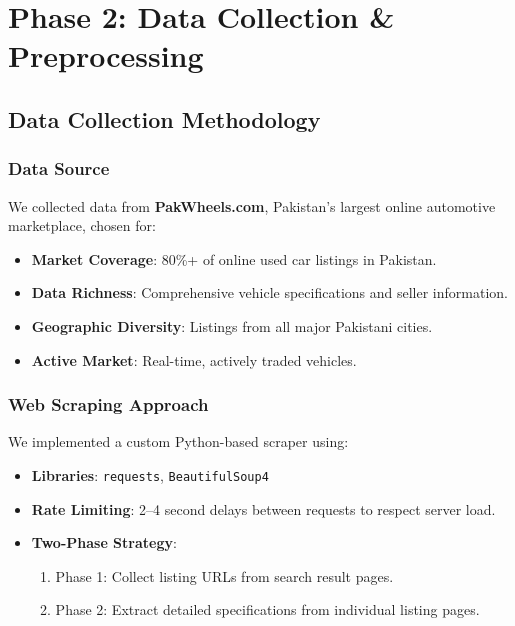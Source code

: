 \documentclass[12pt,a4paper]{article}
\begin{document}
\section{Phase 2: Data Collection \& Preprocessing}

\subsection{Data Collection Methodology}

\subsubsection{Data Source}

We collected data from \textbf{PakWheels.com}, Pakistan's largest online automotive marketplace, chosen for:
\begin{itemize}
    \item \textbf{Market Coverage}: 80\%+ of online used car listings in Pakistan.
    \item \textbf{Data Richness}: Comprehensive vehicle specifications and seller information.
    \item \textbf{Geographic Diversity}: Listings from all major Pakistani cities.
    \item \textbf{Active Market}: Real-time, actively traded vehicles.
\end{itemize}

\subsubsection{Web Scraping Approach}

We implemented a custom Python-based scraper using:
\begin{itemize}
    \item \textbf{Libraries}: \texttt{requests}, \texttt{BeautifulSoup4}
    \item \textbf{Rate Limiting}: 2--4 second delays between requests to respect server load.
    \item \textbf{Two-Phase Strategy}:
    \begin{enumerate}
        \item Phase 1: Collect listing URLs from search result pages.
        \item Phase 2: Extract detailed specifications from individual listing pages.
    \end{enumerate}
\end{itemize}
\end{document}
